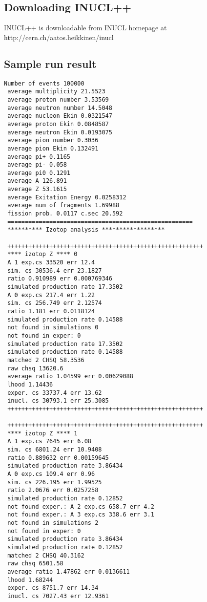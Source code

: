 \subsection{Downloading INUCL++}
INUCL++ is downloadable from INUCL homepage at
http://cern.ch/aatos.heikkinen/inucl


\subsection{Sample run result}
\scriptsize
\begin{verbatim}
Number of events 100000
 average multiplicity 21.5523
 average proton number 3.53569
 average neutron number 14.5048
 average nucleon Ekin 0.0321547
 average proton Ekin 0.0848587
 average neutron Ekin 0.0193075
 average pion number 0.3036
 average pion Ekin 0.132491
 average pi+ 0.1165
 average pi- 0.058
 average pi0 0.1291
 average A 126.891
 average Z 53.1615
 average Exitation Energy 0.0258312
 average num of fragments 1.69988
 fission prob. 0.0117 c.sec 20.592
 =====================================================
 ********** Izotop analysis ******************

 ++++++++++++++++++++++++++++++++++++++++++++++++++++++++
 **** izotop Z **** 0
 A 1 exp.cs 33520 err 12.4
 sim. cs 30536.4 err 23.1827
 ratio 0.910989 err 0.000769346
 simulated production rate 17.3502
 A 0 exp.cs 217.4 err 1.22
 sim. cs 256.749 err 2.12574
 ratio 1.181 err 0.0118124
 simulated production rate 0.14588
 not found in simulations 0
 not found in exper: 0
 simulated production rate 17.3502
 simulated production rate 0.14588
 matched 2 CHSQ 58.3536
 raw chsq 13620.6
 average ratio 1.04599 err 0.00629088
 lhood 1.14436
 exper. cs 33737.4 err 13.62
 inucl. cs 30793.1 err 25.3085
 ++++++++++++++++++++++++++++++++++++++++++++++++++++++++

 ++++++++++++++++++++++++++++++++++++++++++++++++++++++++
 **** izotop Z **** 1
 A 1 exp.cs 7645 err 6.08
 sim. cs 6801.24 err 10.9408
 ratio 0.889632 err 0.00159645
 simulated production rate 3.86434
 A 0 exp.cs 109.4 err 0.96
 sim. cs 226.195 err 1.99525
 ratio 2.0676 err 0.0257258
 simulated production rate 0.12852
 not found exper.: A 2 exp.cs 658.7 err 4.2
 not found exper.: A 3 exp.cs 338.6 err 3.1
 not found in simulations 2
 not found in exper: 0
 simulated production rate 3.86434
 simulated production rate 0.12852
 matched 2 CHSQ 40.3162
 raw chsq 6501.58
 average ratio 1.47862 err 0.0136611
 lhood 1.68244
 exper. cs 8751.7 err 14.34
 inucl. cs 7027.43 err 12.9361
\end{verbatim}
\normalsize